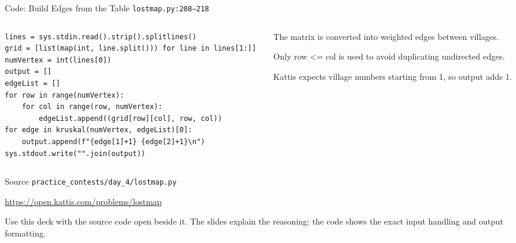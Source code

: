 \documentclass[aspectratio=169,11pt]{beamer}
\begin{document}
\begin{frame}[fragile]{Code: Build Edges from the Table}
\scriptsize
{} \texttt{lostmap.py:208--218}

\vspace{0.08cm}
\begin{columns}[T,totalwidth=\textwidth]
\begin{column}{0.58\textwidth}
\begin{lstlisting}[style=cpcode]
lines = sys.stdin.read().strip().splitlines()
grid = [list(map(int, line.split())) for line in lines[1:]]
numVertex = int(lines[0])
output = []
edgeList = []
for row in range(numVertex):
    for col in range(row, numVertex):
        edgeList.append((grid[row][col], row, col))
for edge in kruskal(numVertex, edgeList)[0]:
    output.append(f"{edge[1]+1} {edge[2]+1}\n")
sys.stdout.write("".join(output))
\end{lstlisting}
\end{column}
\begin{column}{0.38\textwidth}
\begin{tightitemize}
  \item The matrix is converted into weighted edges between villages.
  \item Only row <= col is used to avoid duplicating undirected edges.
  \item Kattis expects village numbers starting from 1, so output adds 1.
\end{tightitemize}
\end{column}
\end{columns}
\end{frame}

\begin{frame}{Source}
\small
{} \texttt{practice\_contests/day\_4/lostmap.py}

\vspace{0.3cm}
 \url{https://open.kattis.com/problems/lostmap}

\vspace{0.45cm}
Use this deck with the source code open beside it. The slides explain the reasoning; the code shows the exact input handling and output formatting.
\end{frame}
\end{document}
